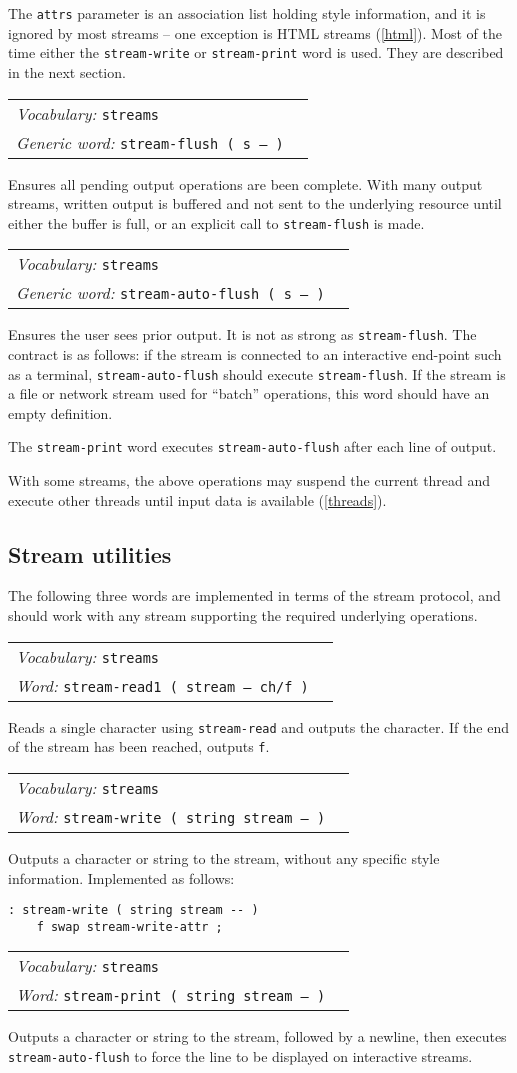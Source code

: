 \documentclass{book}
\newcommand{\vocabulary}[1]{\emph{Vocabulary:} \texttt{#1}&\\}
\newcommand{\ordinaryword}[2]{\index{\texttt{#1}}\emph{Word:} \texttt{#2}&\\}
\newcommand{\genericword}[2]{\index{\texttt{#1}}\emph{Generic word:} \texttt{#2}&\\}
\newcommand{\wordtable}[1]{


\begin{tabularx}{12cm}{lX}
\hline
#1
\hline
\end{tabularx}

}
\begin{document}
The \texttt{attrs} parameter is an association list holding style information, and it is ignored by most streams -- one exception is HTML streams (\ref{html}). Most of the time either the \texttt{stream-write} or \texttt{stream-print} word is used. They are described in the next section.

\wordtable{
\vocabulary{streams}
\genericword{stream-flush}{stream-flush ( s -- )}
}
Ensures all pending output operations are been complete. With many output streams, written output is buffered and not sent to the underlying resource until either the buffer is full, or an explicit call to \texttt{stream-flush} is made.

\wordtable{
\vocabulary{streams}
\genericword{stream-auto-flush}{stream-auto-flush ( s -- )}
}
Ensures the user sees prior output. It is not as strong as \texttt{stream-flush}. The contract is as follows: if the stream is connected to an interactive end-point such as a terminal, \texttt{stream-auto-flush} should execute \texttt{stream-flush}. If the stream is a file or network stream used for ``batch'' operations, this word should have an empty definition.

The \texttt{stream-print} word executes \texttt{stream-auto-flush} after each line of output.

With some streams, the above operations may suspend the current thread and execute other threads until input data is available (\ref{threads}).

\subsection{Stream utilities}

The following three words are implemented in terms of the stream protocol, and should work with any stream supporting the required underlying operations.
\wordtable{
\vocabulary{streams}
\ordinaryword{stream-read1}{stream-read1 ( stream -- ch/f )}

}
Reads a single character using \texttt{stream-read} and outputs the character. If the end of the stream has been reached, outputs \texttt{f}.
\wordtable{
\vocabulary{streams}
\ordinaryword{stream-write}{stream-write ( string stream -- )}

}
Outputs a character or string to the stream, without any specific style information. Implemented as follows:
\begin{verbatim}
: stream-write ( string stream -- )
    f swap stream-write-attr ;
\end{verbatim}
\wordtable{
\vocabulary{streams}
\ordinaryword{stream-print}{stream-print ( string stream -- )}

}
Outputs a character or string to the stream, followed by a newline, then executes \texttt{stream-auto-flush} to force the line to be displayed on interactive streams.
\end{document}
